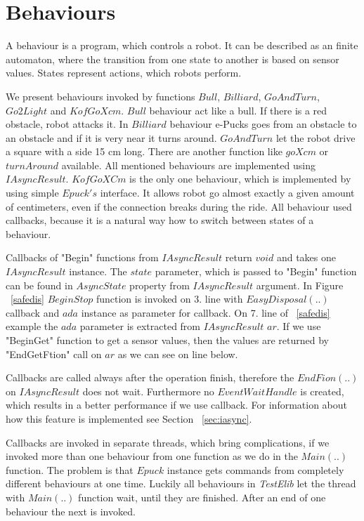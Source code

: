 \section{Behaviours} \label{behaviours}
  A behaviour is a program, which controls a robot. It can be described as an finite automaton, 
  where the transition from one state to another is based on sensor values.
  States represent actions, which robots perform.
  
  We present behaviours invoked by functions $Bull$, $Billiard$, $GoAndTurn$,$Go2Light$ and $KofGoXcm$.
  $Bull$ behaviour act like a bull. If there is a red obstacle, robot attacks it. 
  In $Billiard$ behaviour e-Pucks goes from an obstacle to an obstacle
  and if it is very near it turns around.
  $GoAndTurn$ let the robot drive a square with a side 15 cm long. 
  There are another function like $goXcm$ or $turnAround$ available.
  All mentioned behaviours are implemented using $IAsyncResult$. 
  $KofGoXCm$ is the only one behaviour, which is implemented by using simple $Epuck's$ interface.
  It allows robot go almost exactly a given amount of centimeters, even if the connection breaks during the ride.
  All behaviour used  callbacks, because it is a natural way how to switch between states of a behaviour.

  Callbacks of "Begin" functions from $IAsyncResult$ return $void$ and takes one $IAsyncResult$ instance.
  The $state$ parameter, which is passed to "Begin" function can be found in $AsyncState$ property from $IAsyncResult$ argument.
  In Figure ~\ref{safedis} $BeginStop$ function is invoked on 3. line with $EasyDisposal(..)$ callback 
  and $ada$ instance as parameter for callback.
  On 7. line of ~\ref{safedis} example the $ada$ parameter is extracted from $IAsyncResult$ $ar$.
  If we use "BeginGet" function to get a sensor values, then the values are returned by "EndGetFtion" call on $ar$ as we can see
  on line below.

  Callbacks are called always after the operation finish, therefore the $EndFion(..)$ on $IAsyncResult$ does not wait.
  Furthermore no $EventWaitHandle$ is created, which results in a better performance if we use callback.
  For information about how this feature is implemented see Section ~\ref{sec:iasync}.

  Callbacks are invoked in separate threads, which bring complications, if we invoked more than one behaviour
  from one function as we do in the $Main(..)$ function. The problem is that $Epuck$ instance gets 
  commands from completely different behaviours at one time.
  Luckily all behaviours in {\it TestElib} let the thread with $Main(..)$ function wait, until they are finished.
  After an end of one behaviour the next is invoked.

